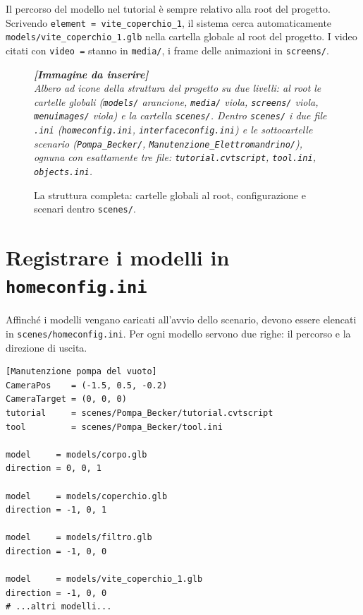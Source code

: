 ﻿\documentclass[a4paper,12pt,oneside]{book}
\newcommand{\kw}[1]{\texttt{\color{keycolor}#1}}
\newcommand{\file}[1]{\texttt{#1}}
\newcommand{\imgph}[2]{%
  \begin{tcolorbox}[colback=cvtlightblue!30,colframe=cvtblue!40,%
    width=#1,halign=center,valign=center,height=5cm,boxrule=0.5pt,arc=3pt]%
    \textcolor{cvtgray}{\itshape\footnotesize\textbf{[Immagine da inserire]}\\[3pt]#2}%
  \end{tcolorbox}}
\begin{document}
\begin{notablu}
Il percorso del modello nel tutorial è sempre relativo alla root del
progetto. Scrivendo \texttt{element = vite\_coperchio\_1}, il sistema
cerca automaticamente \file{models/vite\_coperchio\_1.glb} nella cartella
globale al root del progetto. I video citati con \kw{video =} stanno in
\file{media/}, i frame delle animazioni in \file{screens/}.
\end{notablu}

\begin{figure}[H]
  \centering
  \imgph{12cm}{Albero ad icone della struttura del progetto su due livelli: al root le cartelle globali (\file{models/} arancione, \file{media/} viola, \file{screens/} viola, \file{menuimages/} viola) e la cartella \file{scenes/}. Dentro \file{scenes/} i due file \file{.ini} (\file{homeconfig.ini}, \file{interfaceconfig.ini}) e le sottocartelle scenario (\file{Pompa\_Becker/}, \file{Manutenzione\_Elettromandrino/}), ognuna con esattamente tre file: \file{tutorial.cvtscript}, \file{tool.ini}, \file{objects.ini}.}
  \caption{La struttura completa: cartelle globali al root, configurazione e scenari dentro \file{scenes/}.}
  \label{fig:struttura-cartelle}
\end{figure}

\section{Registrare i modelli in \texttt{homeconfig.ini}}

Affinché i modelli vengano caricati all'avvio dello scenario, devono
essere elencati in \file{scenes/homeconfig.ini}. Per ogni modello
servono due righe: il percorso e la direzione di uscita.

\begin{esempiocvt}
\begin{lstlisting}
[Manutenzione pompa del vuoto]
CameraPos    = (-1.5, 0.5, -0.2)
CameraTarget = (0, 0, 0)
tutorial     = scenes/Pompa_Becker/tutorial.cvtscript
tool         = scenes/Pompa_Becker/tool.ini

model     = models/corpo.glb
direction = 0, 0, 1

model     = models/coperchio.glb
direction = -1, 0, 1

model     = models/filtro.glb
direction = -1, 0, 0

model     = models/vite_coperchio_1.glb
direction = -1, 0, 0
# ...altri modelli...
\end{lstlisting}
\end{esempiocvt}
\end{document}

